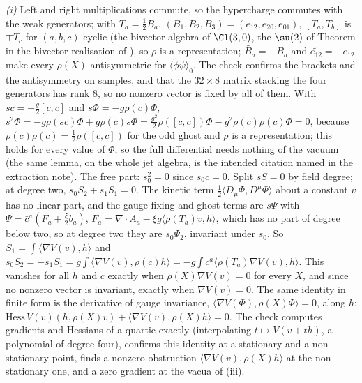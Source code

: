 \emph{(i)} Left and right multiplications commute, so the hypercharge commutes with the weak generators; with $T_{a} = \tfrac12B_{a}$, $(B_{1}, B_{2}, B_{3}) = (e_{12}, e_{20}, e_{01})$, $[T_{a}, T_{b}]$ is $\mp T_{c}$ for $(a, b, c)$ cyclic (the bivector algebra of $\Cl(3,0)$, the $\su(2)$ of Theorem  in the bivector realisation of ), so $\rho$ is a representation; $\widetilde{B_{a}} = -B_{a}$ and $\widetilde{e_{12}} = -e_{12}$ make every $\rho(X)$ antisymmetric for $\langle\widetilde{\phi}\psi\rangle_{0}$. The check confirms the brackets and the antisymmetry on samples, and that the $32 \times 8$ matrix stacking the four generators has rank $8$, so no nonzero vector is fixed by all of them. With $sc = -\tfrac{g}{2}[c, c]$ and $s\Phi = -g\rho(c)\Phi$, $s^{2}\Phi = -g\rho(sc)\Phi + g\rho(c)s\Phi = \tfrac{g^{2}}{2}\rho([c, c])\Phi - g^{2}\rho(c)\rho(c)\Phi = 0$, because $\rho(c)\rho(c) = \tfrac12\rho([c, c])$ for the odd ghost and $\rho$ is a representation; this holds for every value of $\Phi$, so the full differential needs nothing of the vacuum (the same lemma, on the whole jet algebra, is the intended citation named in the extraction note). The free part: $s_{0}^{2} = 0$ since $s_{0}c = 0$. Split $sS = 0$ by field degree; at degree two, $s_{0}S_{2} + s_{1}S_{1} = 0$. The kinetic term $\tfrac12\langle D_{\mu}\Phi, D^{\mu}\Phi\rangle$ about a constant $v$ has no linear part, and the gauge-fixing and ghost terms are $s\Psi$ with $\Psi = \bar c^{a}(F_{a} + \tfrac{\xi}{2}b_{a})$, $F_{a} = \nabla\cdot A_{a} - \xi g\langle\rho(T_{a})v, h\rangle$, which has no part of degree below two, so at degree two they are $s_{0}\Psi_{2}$, invariant under $s_{0}$. So $S_{1} = \int\langle\nabla V(v), h\rangle$ and $s_{0}S_{2} = -s_{1}S_{1} = g\int\langle\nabla V(v), \rho(c)h\rangle = -g\int c^{a}\langle\rho(T_{a})\nabla V(v), h\rangle$. This vanishes for all $h$ and $c$ exactly when $\rho(X)\nabla V(v) = 0$ for every $X$, and since no nonzero vector is invariant, exactly when $\nabla V(v) = 0$. The same identity in finite form is the derivative of gauge invariance, $\langle\nabla V(\Phi), \rho(X)\Phi\rangle = 0$, along $h$: $\mathrm{Hess}\,V(v)(h, \rho(X)v) + \langle\nabla V(v), \rho(X)h\rangle = 0$. The check computes gradients and Hessians of a quartic exactly (interpolating $t \mapsto V(v + th)$, a polynomial of degree four), confirms this identity at a stationary and a non-stationary point, finds a nonzero obstruction $\langle\nabla V(v), \rho(X)h\rangle$ at the non-stationary one, and a zero gradient at the vacua of (iii).

